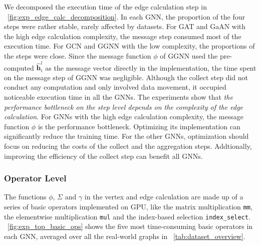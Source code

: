We decomposed the execution time of the edge calculation step in \figurename~\ref{fig:exp_edge_calc_decomposition}.
In each GNN, the proportion of the four steps were rather stable, rarely affected by datasets.
For GAT and GaAN with the high edge calculation complexity, the message step consumed most of the execution time.
For GCN and GGNN with the low complexity, the proportions of the steps were close.
Since the message function $\phi$ of GGNN used the pre-computed $\hat{\boldsymbol{h}}^l_i$ as the message vector directly in the implementation, the time spent on the message step of GGNN was negligible. 
Although the collect step did not conduct any computation and only involved data movement, it occupied noticeable execution time in all the GNNs.
The experiments show that \emph{the performance bottleneck on the step level depends on the complexity of the edge calculation}.
For GNNs with the high edge calculation complexity, the message function $\phi$ is the performance bottleneck.
Optimizing its implementation can significantly reduce the training time.
For the other GNNs, optimization should focus on reducing the costs of the collect and the aggregation steps.
Addtionally, improving the efficiency of the collect step can benefit all GNNs.

\subsubsection{Operator Level}

The functions $\phi$, $\Sigma$ and $\gamma$ in the vertex and edge calculation are made up of a series of basic operators implemented on GPU, like the matrix multiplication \texttt{mm}, the elementwise multiplication \texttt{mul} and the index-based selection \texttt{index\_select}.
\figurename~\ref{fig:exp_top_basic_ops} shows the five most time-consuming basic operators in each GNN, averaged over all the real-world graphs in \tablename~\ref{tab:dataset_overview}.

